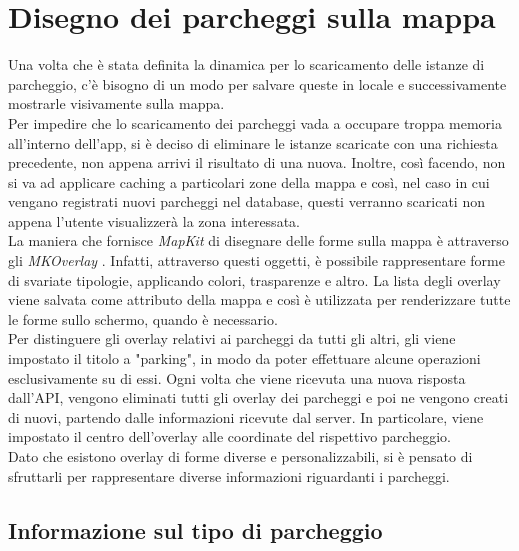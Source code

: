 \section{Disegno dei parcheggi sulla mappa} 

Una volta che è stata definita la dinamica per lo scaricamento delle istanze di 
parcheggio, c'è bisogno di un modo per salvare queste in locale e successivamente 
mostrarle visivamente sulla mappa.\\
Per impedire che lo scaricamento dei parcheggi vada a occupare troppa memoria 
all'interno dell'app, si è deciso di eliminare le istanze scaricate con una 
richiesta precedente, non appena arrivi il risultato di una nuova. Inoltre, 
così facendo, non si va ad applicare caching a particolari zone della mappa
e così, nel caso in cui vengano registrati nuovi parcheggi nel database, questi 
verranno scaricati non appena l'utente visualizzerà la zona interessata.\\
La maniera che fornisce \emph{MapKit} di disegnare delle forme sulla mappa è 
attraverso gli \emph{MKOverlay} \cite{displaying_objects_map}. Infatti, 
attraverso questi oggetti, è possibile
rappresentare forme di svariate tipologie, applicando colori, trasparenze e altro.
La lista degli overlay viene salvata come attributo della mappa e così 
è utilizzata per renderizzare tutte le forme sullo schermo, quando è necessario.\\
Per distinguere gli overlay relativi ai parcheggi da tutti gli altri, gli 
viene impostato il titolo a "parking", in modo da poter effettuare alcune operazioni 
esclusivamente su di essi. Ogni volta che viene ricevuta una nuova risposta dall'API, 
vengono eliminati tutti gli overlay dei parcheggi e poi ne vengono creati 
di nuovi, partendo dalle informazioni ricevute dal server. In particolare, viene 
impostato il centro dell'overlay alle coordinate del rispettivo parcheggio.\\
Dato che esistono overlay di forme diverse e personalizzabili, si è pensato di 
sfruttarli per rappresentare diverse informazioni riguardanti i parcheggi.

\subsection{Informazione sul tipo di parcheggio} 

